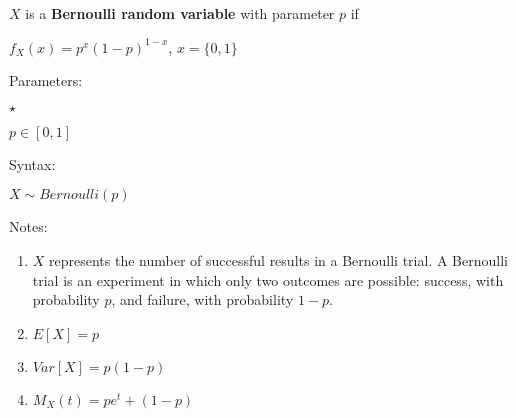 \documentclass[12pt]{article}
\begin{document}
$X$ is a \textbf{Bernoulli random variable} with parameter \textbf{$p$} if\\
\par
$f_X(x) = p^x (1-p)^{1-x}$,     $x=\{0,1\}$	\\
\par
Parameters:\\
\par
\begin{list}{$\star$ }{}
\item $p \in [0,1]$
\end{list}
\par
Syntax:\\
\par
$X\sim Bernoulli(p)$\\
\par
Notes:\\
\par
\begin{enumerate}

\item $X$ represents the number of successful results in a Bernoulli trial. A Bernoulli trial is an experiment in which only two outcomes are possible: success, with probability $p$, and failure, with probability $1-p$.
\item $E[X] = p$
\item $Var[X] = p(1-p)$
\item $M_X(t) = p e^t + (1-p)$

\end{enumerate}
\end{document}
